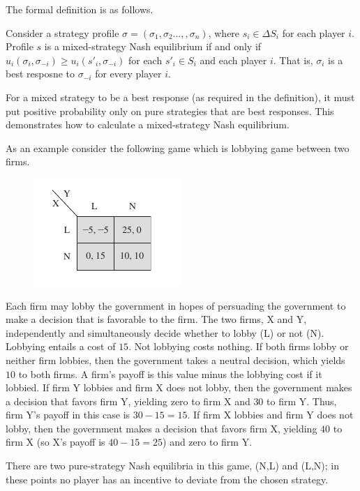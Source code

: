 The formal definition is as follows.

\begin{definition}
    Consider a strategy profile $\sigma = (\sigma_1 , \sigma_2 \ldots, , \sigma_n)$, where $s_i \in \Delta S_i$ for each player $i$. Profile $s$ is a mixed-strategy Nash equilibrium if and only if $u_i(\sigma_i , \sigma_{-i}) \geq u_i(s'_i , \sigma_{-i})$ for each $s'_i \in S_i$ and each player $i$. That is, $\sigma_i$ is a best resposne to $\sigma_{-i}$ for every player $i$.
\end{definition}

For a mixed strategy to be a best response (as required in the definition), it must put positive probability only on pure strategies that are best responses. This demonstrates how to calculate a mixed-strategy Nash equilibrium.

As an example consider the following game which is lobbying game between two firms.

\begin{figure}[H]
    \centering
    \includegraphics[scale=0.7]{images/2023-11-24-game_theory_01.png}
\end{figure}

Each firm may lobby the government in hopes of persuading the government to make a decision that is favorable to the firm. The two firms, X and Y, independently and simultaneously decide whether to lobby (L) or not (N). Lobbying entails a cost of $15$. Not lobbying costs nothing. If both firms lobby or neither firm lobbies, then the government takes a neutral decision, which yields $10$ to both firms. A firm’s payoff is this value minus the lobbying cost if it lobbied. If firm Y lobbies and firm X does not lobby, then the government makes a decision that favors firm Y, yielding zero to firm X and $30$ to firm Y. Thus, firm Y’s payoff in this case is $30 - 15 = 15$. If firm X lobbies and firm Y does not lobby, then the government makes a decision that favors firm X, yielding $40$ to firm X (so X’s payoff is $40 - 15 = 25$) and zero to firm Y.

There are two pure-strategy Nash equilibria in this game, (N,L) and (L,N); in these points no player has an incentive to deviate from the chosen strategy.

